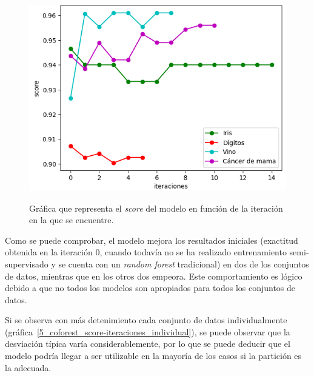 \begin{figure}[h]
	\caption{Gráfica que representa el \textit{score} del modelo en función de la iteración en la que se encuentre.}
	\centering
	\includegraphics[scale=0.7]{../img/memoria/5_coforest_score-iteraciones}
	\label{5_coforest_score-iteraciones}
\end{figure}

Como se puede comprobar, el modelo mejora los resultados iniciales (exactitud obtenida en la iteración $0$, cuando todavía no se ha realizado entrenamiento semi-supervisado y se cuenta con un \textit{random forest} tradicional) en dos de los conjuntos de datos, mientras que en los otros dos empeora. Este comportamiento es lógico debido a que no todos los modelos son apropiados para todos los conjuntos de datos. 

Si se observa con más detenimiento cada conjunto de datos individualmente (gráfica~\ref{5_coforest_score-iteraciones_individual}), se puede observar que la desviación típica varía considerablemente, por lo que se puede deducir que el modelo podría llegar a ser utilizable en la mayoría de los casos si la partición es la adecuada.

